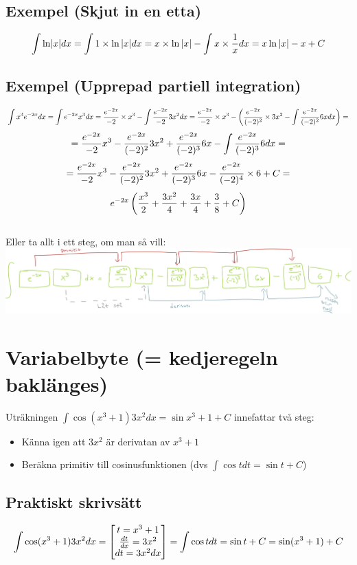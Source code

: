 \documentclass{article}
\begin{document}
\subsection{Exempel (Skjut in en etta)}
$$ \int{\ln \lvert x\rvert dx}=\int{1\times \ln{\lvert x\rvert} dx} = x \times \ln{\lvert x\rvert} - \int{x \times \frac{1}{x} dx} = x \ln{\lvert x\rvert} - x + C $$

\subsection{Exempel (Upprepad partiell integration)}
$$ \int{x^3 e^{-2x} dx} = \int{e^{-2x}x^3 dx} = \frac{e^{-2x}}{-2} \times x^3 - \int{\frac{e^{-2x}}{-2} 3x^2 dx} = \frac{e^{-2x}}{-2}\times x^3 - \left( \frac{e^{-2x}}{(-2)^2}\times 3x^2 - \int{\frac{e^{-2x}}{(-2)^2} 6x dx}\right)=$$
$$ = \frac{e^{-2x}}{-2}x^3  - \frac{e^{-2x}}{(-2)^2} 3x^2 + \frac{e^{-2x}}{(-2)^3}6x - \int{\frac{e^{-2x}}{(-2)^3} 6 dx}=$$
$$ = \frac{e^{-2x}}{-2}x^3  - \frac{e^{-2x}}{(-2)^2} 3x^2 + \frac{e^{-2x}}{(-2)^3}6x - \frac{e^{-2x}}{(-2)^4}\times 6 + C=$$
$$ e^{-2x}\left(\frac{x^3}{2} + \frac{3x^2}{4} + \frac{3x}{4} + \frac{3}{8} + C\right) $$
\\
Eller ta allt i ett steg, om man så vill:\\
\includegraphics[scale=0.3]{img/img2.pdf}

\section{Variabelbyte (= kedjeregeln baklänges)}
Uträkningen $\int{\cos(x^3+1)3x^2 dx} = \sin{x^3+1} + C$ innefattar två steg:
\begin{itemize}
    \item Känna igen att $3x^2$ är derivatan av $x^3+1$
    \item Beräkna primitiv till cosinusfunktionen (dvs $\int{\cos t dt} = \sin t + C$)
\end{itemize}

\subsection{Praktiskt skrivsätt}
$$ \int{\cos(x^3+1)3x^2 dx} = \left[\begin{matrix}t=x^3+1 \\ \frac{dt}{dx} = 3x^2 \\ dt=3x^2 dx\end{matrix}\right] = \int{\cos t dt} = \sin t + C = \sin (x^3+1) + C$$
\end{document}
